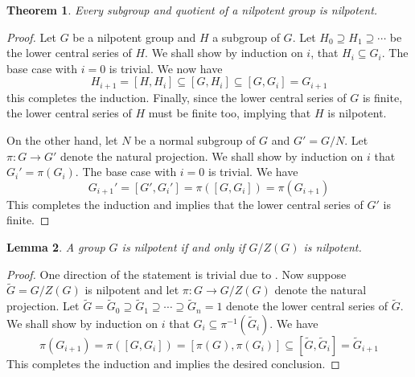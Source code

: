 \documentclass[12pt]{article}
\theoremstyle{thmstyle}
\newtheorem{theorem}{Theorem}[section]
\newtheorem{lemma}[theorem]{Lemma}
\theoremstyle{defstyle}
\begin{document}
\begin{theorem}
    Every subgroup and quotient of a nilpotent group is nilpotent.
\end{theorem}
\begin{proof}
    Let $G$ be a nilpotent group and $H$ a subgroup of $G$. Let $H_0\supseteq H_1\supseteq\cdots$ be the lower central series of $H$. We shall show by induction on $i$, that $H_i\subseteq G_i$. The base case with $i = 0$ is trivial. We now have 
    \begin{equation*}
        H_{i + 1} = [H, H_i]\subseteq [G, H_i]\subseteq [G, G_i] = G_{i + 1}
    \end{equation*}
    this completes the induction. Finally, since the lower central series of $G$ is finite, the lower central series of $H$ must be finite too, implying that $H$ is nilpotent.

    On the other hand, let $N$ be a normal subgroup of $G$ and $G' = G/N$. Let $\pi: G\to G'$ denote the natural projection. We shall show by induction on $i$ that $G_i' = \pi(G_i)$. The base case with $i = 0$ is trivial. We have 
    \begin{equation*}
        G_{i + 1}' = [G', G_i'] = \pi([G, G_i]) = \pi(G_{i + 1})
    \end{equation*}
    This completes the induction and implies that the lower central series of $G'$ is finite.
\end{proof}

\begin{lemma}
    A group $G$ is nilpotent if and only if $G/Z(G)$ is nilpotent.
\end{lemma}
\begin{proof}
    One direction of the statement is trivial due to . Now suppose $\widetilde{G} = G/Z(G)$ is nilpotent and let $\pi: G\to G/Z(G)$ denote the natural projection. Let $\widetilde{G} = \widetilde{G}_0\supseteq\widetilde{G}_1\supseteq\cdots\supseteq\widetilde{G}_n = 1$ denote the lower central series of $\widetilde{G}$. We shall show by induction on $i$ that $G_i\subseteq\pi^{-1}(\widetilde{G}_i)$. We have 
    \begin{equation*}
        \pi(G_{i + 1}) = \pi([G, G_{i}]) = [\pi(G), \pi(G_i)]\subseteq[\widetilde{G},\widetilde{G}_i] = \widetilde{G}_{i + 1}
    \end{equation*}
    This completes the induction and implies the desired conclusion.
\end{proof}
\end{document}
